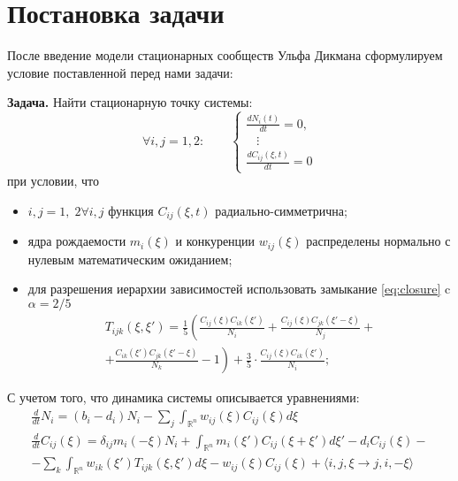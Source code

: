 \chapter{Постановка задачи}

После введение модели стационарных сообществ Ульфа Дикмана сформулируем условие поставленной перед нами задачи:


\textbf{Задача.} Найти стационарную точку системы:
\begin{equation*}
\forall i,j=1,2:\qquad\begin{cases}
\frac{dN_{i}(t)}{dt}=0,\\
\;\;\;\vdots\\
\frac{dC_{ij}(\xi,t)}{dt}=0
\end{cases}
\end{equation*}
при условии, что 
\begin{itemize}
	\item $ i,j=1,\;2 \forall i,j $ функция $ C_{ij}(\xi,t) $ радиально-симметрична; 
	\item ядра рождаемости $ m_{i}(\xi) $ и конкуренции $ w_{ij}(\xi) $ распределены нормально с нулевым математическим ожиданием;
	\item для разрешения иерархии зависимостей использовать замыкание \ref{eq:closure} c $\alpha=2/5$ \begin{multline*}
T_{ijk}(\xi,\xi')=\frac{1}{5}\left(\frac{C_{ij}(\xi)C_{ik}(\xi')}{N_{i}}+\frac{C_{ij}(\xi)C_{jk}(\xi'-\xi)}{N_{j}}+\right.\\
\left.+\frac{C_{ik}(\xi')C_{jk}(\xi'-\xi)}{N_{k}}-1\right)+\frac{3}{5}\cdot\frac{C_{ij}(\xi)C_{ik}(\xi')}{N_{i}};
\end{multline*}
\end{itemize}
С учетом того, что динамика системы описывается уравнениями:
\begin{align*}
\frac{d}{dt}N_{i}=(b_{i}-d_{i})N_{i}-\sum_{j}\int_{\mathbb{R}^{n}}w_{ij}(\xi)C_{ij}(\xi)d\xi \\
\frac{d}{dt}C_{ij}(\xi)	=	\delta_{ij}m_{i}(-\xi)N_{i}+\int_{\mathbb{\mathbb{R}}^{n}}m_{i}(\xi')C_{ij}(\xi+\xi')d\xi'-d_{i}C_{ij}(\xi)-\\
-\sum_{k}\int_{\mathbb{\mathbb{R}}^{n}}w_{ik}(\xi')T_{ijk}(\xi,\xi')d\xi-w_{ij}(\xi)C_{ij}(\xi)+\langle i,j,\xi\to j,i,-\xi\rangle
\end{align*}

